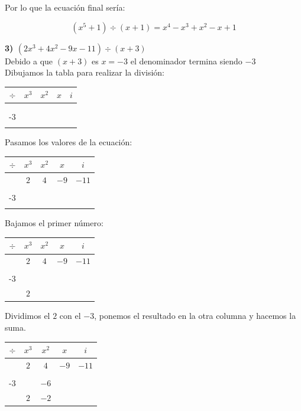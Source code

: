 \documentclass[11pt]{report}
\begin{document}
\indent Por lo que la ecuación final sería:

$$(x^{5}+1) \div (x+1)=x^{4}-x^{3}+x^{2}-x+1$$

\pagebreak
\indent \textbf { 3) $(2x^{3}+4x^{2}-9x-11) \div (x+3)$ }\\[2mm]
\indent Debido a que $(x+3)$ es $x=-3$ el denominador termina siendo $-3$ \\[2mm]
\indent Dibujamos la tabla para realizar la división:

\begin{center}
	\begin{tabular}{c|cccc|}
		$\div$ & $x^{3}$ & $x^{2}$ & $x$ & $i$\\ \hline
		&  &  &  & \\
		& & & &\\
		-3&  &  &  &  \\ \hline
		&  & &  &  \\
	\end{tabular}
\end{center}

\indent Pasamos los valores de la ecuación:
\begin{center}
	\begin{tabular}{c|cccc|}
		$\div$ & $x^{3}$ & $x^{2}$ & $x$ & $i$\\ \hline
		& $2$ & $4$ & $-9$ & $-11$\\
		& & & &\\
		-3&  &  &  &  \\ \hline
		&  & &  &  \\
	\end{tabular}
\end{center}

\indent Bajamos el primer número:
\begin{center}
	\begin{tabular}{c|cccc|}
		$\div$ & $x^{3}$ & $x^{2}$ & $x$ & $i$\\ \hline
		& $2$ & $4$ & $-9$ & $-11$\\
		& & & &\\
		-3&  &  &  &  \\ \hline
		& $2$ & &  &  \\
	\end{tabular}
\end{center}	
	
\indent Dividimos el $2$ con el $-3$, ponemos el resultado en la otra columna y hacemos la suma.
\begin{center}
	\begin{tabular}{c|cccc|}
		$\div$ & $x^{3}$ & $x^{2}$ & $x$ & $i$\\ \hline
		& $2$ & $4$ & $-9$ & $-11$\\
		& & & &\\
		-3&  & $-6$ &  &\\ \hline
		& $2$ & $-2$ & &  \\
	\end{tabular}
\end{center}
\end{document}
